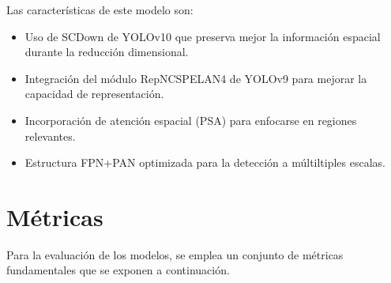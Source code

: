 \documentclass[12pt,a4paper,onecolumn,oneside]{report}
\begin{document}
\begin{table}[H]
\caption{Estructura del \textit{head} del modelo personalizado}
\centering
{}
\end{table}

Las características de este modelo son:
\begin{itemize}
  \item Uso de SCDown de YOLOv10 que preserva mejor la información espacial durante la reducción dimensional.
  \item Integración del módulo RepNCSPELAN4 de YOLOv9 para mejorar la capacidad de representación.
  \item Incorporación de atención espacial (PSA) para enfocarse en regiones relevantes.
  \item Estructura FPN+PAN optimizada para la detección a múltiltiples escalas.
\end{itemize}

\section{Métricas}
\label{sec:Métricas}
Para la evaluación de los modelos, se emplea un conjunto de métricas fundamentales que se exponen a continuación.
\end{document}

